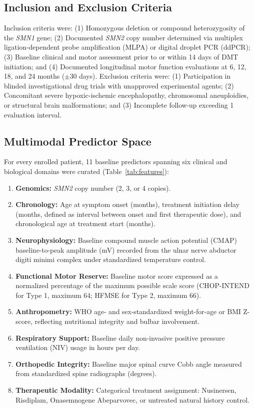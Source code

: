 \documentclass[journal]{IEEEtran}
\begin{document}
\subsection{Inclusion and Exclusion Criteria}
Inclusion criteria were: (1) Homozygous deletion or compound heterozygosity of the \textit{SMN1} gene; (2) Documented \textit{SMN2} copy number determined via multiplex ligation-dependent probe amplification (MLPA) or digital droplet PCR (ddPCR); (3) Baseline clinical and motor assessment prior to or within 14 days of DMT initiation; and (4) Documented longitudinal motor function evaluations at 6, 12, 18, and 24 months ($\pm 30$ days). Exclusion criteria were: (1) Participation in blinded investigational drug trials with unapproved experimental agents; (2) Concomitant severe hypoxic-ischemic encephalopathy, chromosomal aneuploidies, or structural brain malformations; and (3) Incomplete follow-up exceeding 1 evaluation interval.

\subsection{Multimodal Predictor Space}
For every enrolled patient, 11 baseline predictors spanning six clinical and biological domains were curated (Table~\ref{tab:features}):
\begin{enumerate}
    \item \textbf{Genomics:} \textit{SMN2} copy number (2, 3, or 4 copies).
    \item \textbf{Chronology:} Age at symptom onset (months), treatment initiation delay (months, defined as interval between onset and first therapeutic dose), and chronological age at treatment start (months).
    \item \textbf{Neurophysiology:} Baseline compound muscle action potential (CMAP) baseline-to-peak amplitude (mV) recorded from the ulnar nerve abductor digiti minimi complex under standardized temperature control.
    \item \textbf{Functional Motor Reserve:} Baseline motor score expressed as a normalized percentage of the maximum possible scale score (CHOP-INTEND for Type 1, maximum 64; HFMSE for Type 2, maximum 66).
    \item \textbf{Anthropometry:} WHO age- and sex-standardized weight-for-age or BMI Z-score, reflecting nutritional integrity and bulbar involvement.
    \item \textbf{Respiratory Support:} Baseline daily non-invasive positive pressure ventilation (NIV) usage in hours per day.
    \item \textbf{Orthopedic Integrity:} Baseline major spinal curve Cobb angle measured from standardized spine radiographs (degrees).
    \item \textbf{Therapeutic Modality:} Categorical treatment assignment: Nusinersen, Risdiplam, Onasemnogene Abeparvovec, or untreated natural history control.
\end{enumerate}
\end{document}
